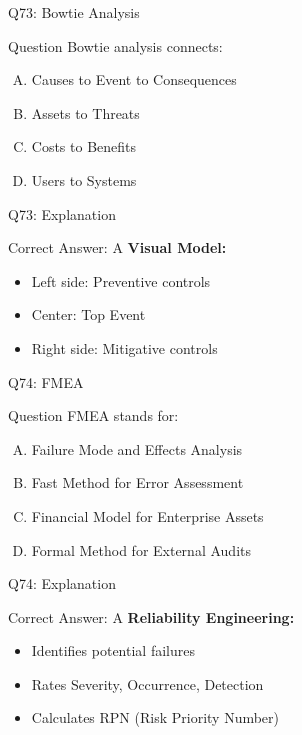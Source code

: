 \documentclass{beamer}
\begin{document}
			\begin{frame}{Q73: Bowtie Analysis}
				\begin{block}{Question}
					Bowtie analysis connects:
				\end{block}
				\begin{enumerate}[(A)]
					\item Causes to Event to Consequences
					\item Assets to Threats
					\item Costs to Benefits
					\item Users to Systems
				\end{enumerate}
			\end{frame}
			\begin{frame}{Q73: Explanation}
				\begin{block}{Correct Answer: A}
					\textbf{Visual Model:}
					\begin{itemize}
						\item Left side: Preventive controls
						\item Center: Top Event
						\item Right side: Mitigative controls
					\end{itemize}
				\end{block}
			\end{frame}
			
			\begin{frame}{Q74: FMEA}
				\begin{block}{Question}
					FMEA stands for:
				\end{block}
				\begin{enumerate}[(A)]
					\item Failure Mode and Effects Analysis
					\item Fast Method for Error Assessment
					\item Financial Model for Enterprise Assets
					\item Formal Method for External Audits
				\end{enumerate}
			\end{frame}
			\begin{frame}{Q74: Explanation}
				\begin{block}{Correct Answer: A}
					\textbf{Reliability Engineering:}
					\begin{itemize}
						\item Identifies potential failures
						\item Rates Severity, Occurrence, Detection
						\item Calculates RPN (Risk Priority Number)
					\end{itemize}
				\end{block}
			\end{frame}
			
\end{document}
